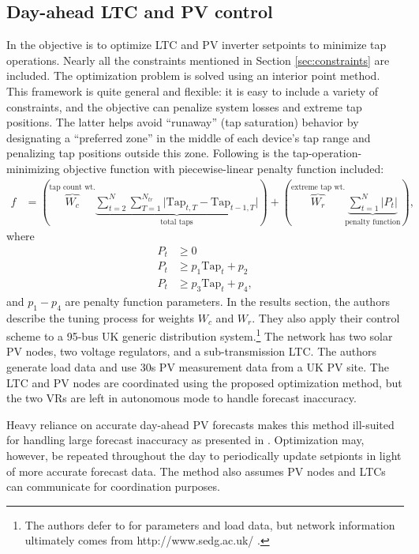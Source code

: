 \documentclass[10pt,letterpaper]{article}
\begin{document}
\subsection{Day-ahead LTC and PV control}
In \cite{agalgaonkar2014} the objective is to optimize LTC and PV inverter setpoints to minimize tap operations. Nearly all the constraints mentioned in Section \ref{sec:constraints} are included. The optimization problem is solved using an interior point method. This framework is quite general and flexible:  it is easy to include a variety of constraints, and the objective can penalize system losses and extreme tap positions. The latter helps avoid ``runaway'' (tap saturation) behavior by designating a ``preferred zone'' in the middle of each device's tap range and penalizing tap positions outside this zone. Following is the tap-operation-minimizing objective function with piecewise-linear penalty function included:
\begin{align}
\nonumber f &= \left(\overbrace{W_c}^\text{tap count wt.} \underbrace{\sum_{t=2}^{N}\sum_{T=1}^{N_{tr}} \lvert \text{Tap}_{t,T} - \text{Tap}_{t-1,T} \rvert}_\text{total taps}\right) + \left( \overbrace{W_r}^\text{extreme tap wt.} \underbrace{\sum_{t=1}^{N} \lvert P_t \rvert}_\text{penalty function}\right),
\end{align}
where
\begin{align*}
P_t &\geq 0 \\
P_t &\geq p_1\text{Tap}_t + p_2 \\
P_t &\geq p_3\text{Tap}_t + p_4,
\end{align*}
and $p_1-p_4$ are penalty function parameters. In the results section, the authors describe the tuning process for weights $W_c$ and $W_r$. They also apply their control scheme to a 95-bus UK generic distribution system.\footnote{The authors defer to \cite{singh2010} for parameters and load data, but network information ultimately comes from http://www.sedg.ac.uk/ .} The network has two solar PV nodes, two voltage regulators, and a sub-transmission LTC. The authors generate load data and use 30s PV measurement data from a UK PV site. The LTC and PV nodes are coordinated using the proposed optimization method, but the two VRs are left in autonomous mode to handle forecast inaccuracy.

Heavy reliance on accurate day-ahead PV forecasts makes this method ill-suited for handling large forecast inaccuracy as presented in \cite{agalgaonkar2014}. Optimization may, however, be repeated throughout the day to periodically update setpionts in light of more accurate forecast data. The method also assumes PV nodes and LTCs can communicate for coordination purposes.
\end{document}
